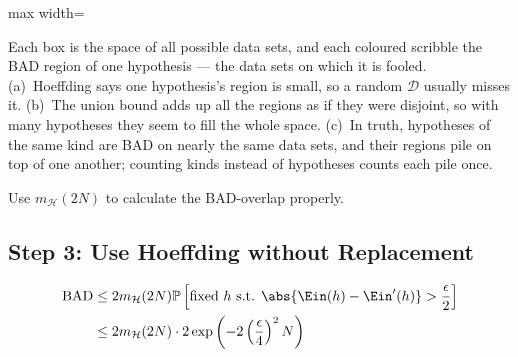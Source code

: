\begin{center}
\begin{adjustbox}{max width=\textwidth}
    \end{adjustbox}
\end{center}

Each box is the space of all possible data sets, and each coloured scribble the
BAD region of one hypothesis --- the data sets on which it is fooled. (a)~Hoeffding
says one hypothesis's region is small, so a random \(\mathcal{D}\) usually
misses it. (b)~The union bound adds up all the regions as if they were
disjoint, so with many hypotheses they seem to fill the whole space. (c)~In
truth, hypotheses of the same kind are BAD on nearly the same data sets, and
their regions pile on top of one another; counting kinds instead of hypotheses
counts each pile once.

\begin{moral}
    Use \(m_{\mathcal{H}}(2N)\) to calculate the BAD-overlap properly.
\end{moral}

\subsection{Step 3: Use Hoeffding without Replacement}

\begin{align*}
    \text{BAD}
    &\le 2 m_{\mathcal{H}}(2N) \mathbb{P}\left[ \text{fixed } h \text{ s.t. }
    \abs{\Ein(h) - \Ein'(h)} > \frac{\epsilon}{2} \right]\\
    &\le 2 m_{\mathcal{H}}(2N) \cdot 2 \exp \left( -2
    \left( \frac{\epsilon}{4} \right)^2 N \right)
\end{align*}


